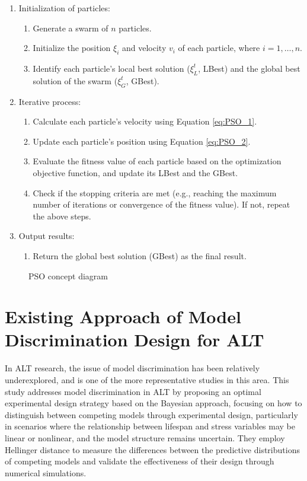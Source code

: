 \begin{enumerate}
\item Initialization of particles:
\begin{enumerate}[→]
    \item Generate a swarm of $n$ particles.
    \item Initialize the position $\xi_i$ and velocity $v_i$ of each particle, where $i = 1, \dots, n$.
    \item Identify each particle's local best solution ($\xi_L^{t}$, LBest) and the global best solution of the swarm ($\xi_G^{t}$, GBest).
\end{enumerate}

\item Iterative process:
\begin{enumerate}[→]
    \item Calculate each particle's velocity using Equation \eqref{eq:PSO_1}.
    \item Update each particle's position using Equation \eqref{eq:PSO_2}.
    \item Evaluate the fitness value of each particle based on the optimization objective function, and update its LBest and the GBest.
    \item Check if the stopping criteria are met (e.g., reaching the maximum number of iterations or convergence of the fitness value). If not, repeat the above steps.
\end{enumerate}

\item Output results:
\begin{enumerate}[→]
    \item Return the global best solution (GBest) as the final result.
\end{enumerate}
\end{enumerate}

\begin{figure}[H]
    \caption{PSO concept diagram}
\label{fig:PSO concept}
\end{figure}

\section{Existing Approach of Model Discrimination Design for ALT}

\hspace*{8mm} In ALT research, the issue of model discrimination has been relatively underexplored, and \cite{nasir2015simulation} is one of the more representative studies in this area. This study addresses model discrimination in ALT by proposing an optimal experimental design strategy based on the Bayesian approach, focusing on how to distinguish between competing models through experimental design, particularly in scenarios where the relationship between lifespan and stress variables may be linear or nonlinear, and the model structure remains uncertain. They employ Hellinger distance to measure the differences between the predictive distributions of competing models and validate the effectiveness of their design through numerical simulations.

